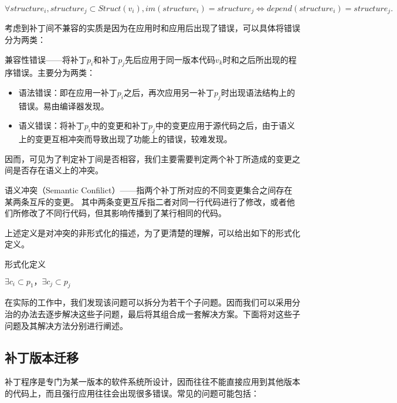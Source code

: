 \begin{definition}
	$\forall structure_i,structure_j \subset Struct(v_i),  im(structure_i) = structure_j \iff depend(structure_i) = structure_j.$
\end{definition}

考虑到补丁间不兼容的实质是因为在应用时和应用后出现了错误，可以具体将错误分为两类：

\begin{definition}
	兼容性错误——将补丁$p_i$和补丁$p_j$先后应用于同一版本代码$v_k$时和之后所出现的程序错误。主要分为两类：
	\begin{itemize}
		\item 语法错误：即在应用一补丁$p_i$之后，再次应用另一补丁$p_j$时出现语法结构上的错误。易由编译器发现。
		\item 语义错误：将补丁$p_i$中的变更和补丁$p_j$中的变更应用于源代码之后，由于语义上的变更互相冲突而导致出现了功能上的错误，较难发现。
	\end{itemize}
\end{definition}

因而，可见为了判定补丁间是否相容，我们主要需要判定两个补丁所造成的变更之间是否存在语义上的冲突。


\begin{definition}
	\label {define_conflict}
	语义冲突（Semantic Confilict）——指两个补丁所对应的不同变更集合之间存在某两条互斥的变更。
	其中两条变更互斥指二者对同一行代码进行了修改，或者他们所修改了不同行代码，但其影响传播到了某行相同的代码。
\end{definition}

上述定义是对冲突的非形式化的描述，为了更清楚的理解，可以给出如下的形式化定义。

\begin{definition}
	\label {problem}
	形式化定义
\end{definition}




$\exists c_i \subset p_1， \exists c_j \subset p_j$




在实际的工作中，我们发现该问题可以拆分为若干个子问题。因而我们可以采用分治的办法去逐步解决这些子问题，最后将其组合成一套解决方案。下面将对这些子问题及其解决方法分别进行阐述。


\subsection{补丁版本迁移}

补丁程序是专门为某一版本的软件系统所设计，因而往往不能直接应用到其他版本的代码上，而且强行应用往往会出现很多错误。常见的问题可能包括：

